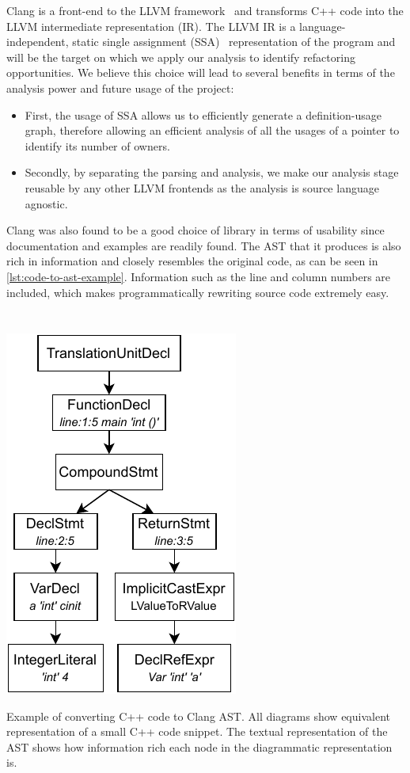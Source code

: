 \documentclass{proposal}
\begin{document}
    Clang is a front-end to the LLVM framework~\cite{Lattner2004} and transforms C++ code into the LLVM intermediate representation (IR).
    The LLVM IR is a language-independent, static single assignment (SSA)~\cite{Rosen1988} representation of the program and will be the target on which we apply our analysis to identify refactoring opportunities.
    We believe this choice will lead to several benefits in terms of the analysis power and future usage of the project:
    \begin{itemize}
        \item First, the usage of SSA allows us to efficiently generate a definition-usage graph, therefore allowing an efficient analysis of all the usages of a pointer to identify its number of owners.
        \item Secondly, by separating the parsing and analysis, we make our analysis stage reusable by any other LLVM frontends as the analysis is source language agnostic.
    \end{itemize}

    Clang was also found to be a good choice of library in terms of usability since documentation and examples are readily found.
    The AST that it produces is also rich in information and closely resembles the original code, as can be seen in \autoref{lst:code-to-ast-example}.
    Information such as the line and column numbers are included, which makes programmatically rewriting source code extremely easy.

    \begin{listing}
        \inputminted{c++}{code/code-to-ast.cpp}
        \inputminted[fontsize=\footnotesize]{text}{code/code-to-ast.txt}
        \centerline{\includegraphics{images/code-to-ast}}
        \caption{Example of converting C++ code to Clang AST. All diagrams show equivalent representation of a small C++ code snippet. The textual representation of the AST shows how information rich each node in the diagrammatic representation is.}
        \label{lst:code-to-ast-example}
    \end{listing}
\end{document}

